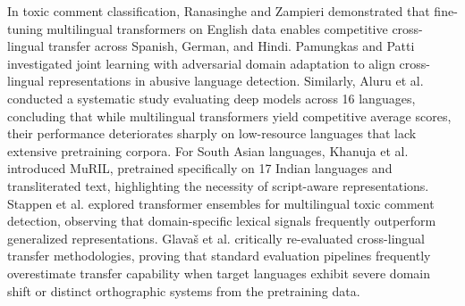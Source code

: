 \documentclass[11pt,a4paper]{article}
\begin{document}
In toxic comment classification, Ranasinghe and Zampieri \cite{ranasinghe2020multilingual} demonstrated that fine-tuning multilingual transformers on English data enables competitive cross-lingual transfer across Spanish, German, and Hindi. Pamungkas and Patti \cite{pamungkas2021joint} investigated joint learning with adversarial domain adaptation to align cross-lingual representations in abusive language detection. Similarly, Aluru et al. \cite{aluru2020deep} conducted a systematic study evaluating deep models across 16 languages, concluding that while multilingual transformers yield competitive average scores, their performance deteriorates sharply on low-resource languages that lack extensive pretraining corpora. For South Asian languages, Khanuja et al. \cite{khanuja2021muril} introduced MuRIL, pretrained specifically on 17 Indian languages and transliterated text, highlighting the necessity of script-aware representations. Stappen et al. \cite{stappen2020cross} explored transformer ensembles for multilingual toxic comment detection, observing that domain-specific lexical signals frequently outperform generalized representations. Glava{\v{s}} et al. \cite{glavas2020xhate} critically re-evaluated cross-lingual transfer methodologies, proving that standard evaluation pipelines frequently overestimate transfer capability when target languages exhibit severe domain shift or distinct orthographic systems from the pretraining data.
\end{document}
